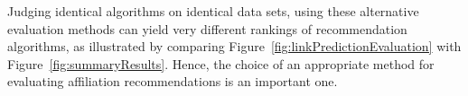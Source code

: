 Judging identical algorithms on identical data sets, using these alternative evaluation methods can yield very different rankings of recommendation algorithms, as illustrated by comparing Figure~\ref{fig:linkPredictionEvaluation} with Figure~\ref{fig:summaryResults}. Hence, the choice of an appropriate method for evaluating affiliation recommendations is an important one.

\begin{figure}[h]
  \begin{center}

\end{center}
\end{figure}
